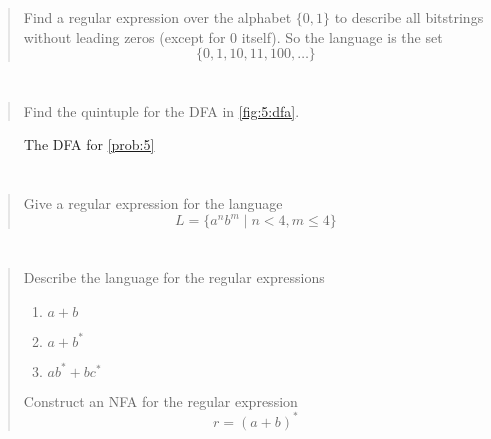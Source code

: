 \documentclass{article}
\begin{document}
\section{}
\begin{quote}
    Find a regular expression over the alphabet $\{0, 1\}$ to describe all bitstrings without
    leading zeros (except for 0 itself). So the language is the set
    \[ \{0, 1, 10, 11, 100, \dots \} \]
\end{quote}

\section{}\label{prob:5}
\begin{quote}
    Find the quintuple for the DFA in \autoref{fig:5:dfa}.
\end{quote}

\begin{figure}[h]
    \centering
    \caption{The DFA for \autoref{prob:5}}\label{fig:5:dfa}
\end{figure}

\section{}
\begin{quote}
    Give a regular expression for the language
    \[L = \{a^n b^m \mid n < 4, m \leq 4\} \]
\end{quote}

\section{}
\begin{quote}
    Describe the language for the regular expressions
    \begin{enumerate}
        \item $a + b$
        \item $a + b^*$
        \item $ab^* + bc^*$
    \end{enumerate}
    Construct an NFA for the regular expression
    \[r = {(a + b)}^*\]
\end{quote}
\end{document}
